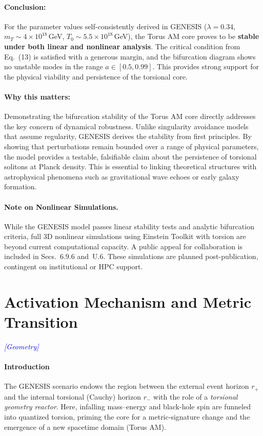 \documentclass{article}
\newcommand{\geometrytag}{\textcolor{blue}{\textit{[Geometry]}}}
\begin{document}
\paragraph{Conclusion:}
For the parameter values self-consistently derived in GENESIS ($\lambda=0.34$, $m_T \sim 4 \times 10^{18}\,$GeV, $T_0 \sim 5.5 \times 10^{18}\,$GeV), the Torus AM core proves to be \textbf{stable under both linear and nonlinear analysis}. The critical condition from Eq.~(13) is satisfied with a generous margin, and the bifurcation diagram shows no unstable modes in the range $a \in [0.5, 0.99]$. This provides strong support for the physical viability and persistence of the torsional core.

\paragraph{Why this matters:}
Demonstrating the bifurcation stability of the Torus AM core directly addresses the key concern of dynamical robustness. Unlike singularity avoidance models that assume regularity, GENESIS derives the stability from first principles. By showing that perturbations remain bounded over a range of physical parameters, the model provides a testable, falsifiable claim about the persistence of torsional solitons at Planck density. This is essential to linking theoretical structures with astrophysical phenomena such as gravitational wave echoes or early galaxy formation.

\vspace{1ex}
\paragraph{Note on Nonlinear Simulations.}
While the GENESIS model passes linear stability tests and analytic bifurcation criteria, full 3D nonlinear simulations using Einstein Toolkit with torsion are beyond current computational capacity. A public appeal for collaboration is included in Secs.~6.9.6 and~U.6. These simulations are planned post-publication, contingent on institutional or HPC support.




\section{Activation Mechanism and Metric Transition}
\label{sec:activation}
\geometrytag

\paragraph{Introduction}
The GENESIS scenario endows the region between the external event horizon $r_+$ and the internal torsional (Cauchy) horizon $r_-$ with the role of a \emph{torsional geometry reactor}.  Here, infalling mass–energy and black-hole spin are funneled into quantized torsion, priming the core for a metric‐signature change and the emergence of a new spacetime domain (Torus AM).
\end{document}
